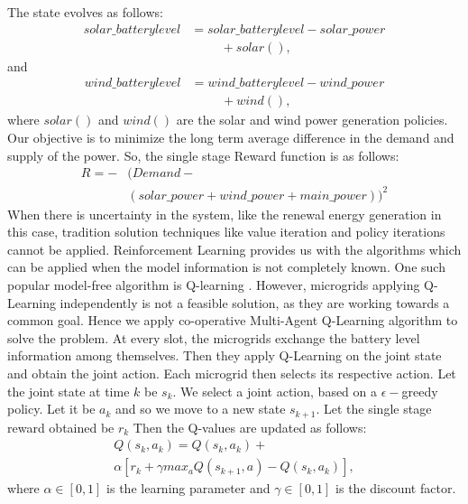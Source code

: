 \documentclass[conference]{IEEEtran}
\begin{document}
The state evolves as follows:
\begin{equation}
\begin{split}
solar\_batterylevel &= solar\_batterylevel - solar\_power \\&\hspace{1cm}+ solar(), 
\end{split}
\end{equation}
and
\begin{equation}
\begin{split}
wind\_batterylevel &= wind\_batterylevel - wind\_power 
\\&\hspace{1cm}  + wind(),
\end{split}
\end{equation}
where
$solar()$ and $wind()$ are the solar and wind power generation policies. 
Our objective is to minimize the long term average difference in the demand and supply of the power. So, the single stage Reward function is as follows:
\begin{equation}
\begin{split}
R = -&(Demand - \\
&(solar\_power+wind\_power+main\_power))^2
\end{split}
\end{equation}
When there is uncertainty in the system, like the renewal energy generation in this case, tradition solution techniques like value iteration and policy iterations cannot be applied. Reinforcement Learning provides us with the algorithms which can be applied when the model information is not completely known. One such popular model-free algorithm is Q-learning \cite{vol2}. However, microgrids applying Q-Learning independently is not a feasible solution, as they are working towards a common goal. Hence we apply co-operative Multi-Agent Q-Learning algorithm \cite{marl} to solve the problem. At every slot, the microgrids exchange the battery level information among themselves. Then they apply Q-Learning on the joint state and obtain the joint action. Each microgrid then selects its respective action. Let the joint state at time $k$ be $s_{k}$. We select a joint action, based on a $\epsilon-$greedy policy. Let it be $a_{k}$ and so we move to a new state $s_{k+1}$. Let the single stage reward obtained be $r_{k}$ Then the Q-values are updated as follows:
\begin{equation}\label{Q-val}
\begin{split}
Q(s_{k},a_{k}) = Q(s_{k},a_{k}) + \\
 \alpha[r_{k}+\gamma max_{a}Q(s_{k+1},a) - Q(s_{k},a_{k})], 
\end{split}
\end{equation}
where $\alpha \in [0,1]$ is the learning parameter and $\gamma \in [0,1]$ is the discount factor.
\end{document}
